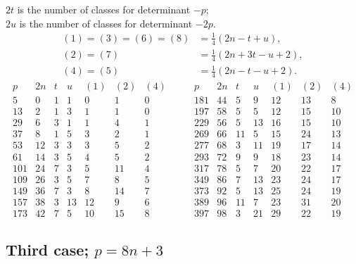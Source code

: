 \documentclass[12pt]{article}
\begin{document}
$2t$ is the number of classes for determinant $-p$;\\
$2u$ is the number of classes for determinant $-2p$.
\[
\begin{aligned}
(1)=(3)=(6)=(8)&=\frac14(2n-t+u),\\
(2)=(7)&=\frac14(2n+3t-u+2),\\
(4)=(5)&=\frac14(2n-t-u+2).
\end{aligned}
\]
{\scriptsize
\[
\begin{array}{r|r|r|r|r|r|r}
p&2n&t&u&(1)&(2)&(4)\\\hline
5&0&1&1&0&1&0\\
13&2&1&3&1&1&0\\
29&6&3&1&1&4&1\\
37&8&1&5&3&2&1\\
53&12&3&3&3&5&2\\
61&14&3&5&4&5&2\\
101&24&7&3&5&11&4\\
109&26&3&5&7&8&5\\
149&36&7&3&8&14&7\\
157&38&3&13&12&9&6\\
173&42&7&5&10&15&8
\end{array}
\qquad
\begin{array}{r|r|r|r|r|r|r}
p&2n&t&u&(1)&(2)&(4)\\\hline
181&44&5&9&12&13&8\\
197&58&5&5&12&15&10\\
229&56&5&13&16&15&10\\
269&66&11&5&15&24&13\\
277&68&3&11&19&17&14\\
293&72&9&9&18&23&14\\
317&78&5&7&20&22&17\\
349&86&7&13&23&24&17\\
373&92&5&13&25&24&19\\
389&96&11&7&23&31&20\\
397&98&3&21&29&22&19
\end{array}
\]
}

\subsection*{Third case; \(p=8n+3\)}
\end{document}
